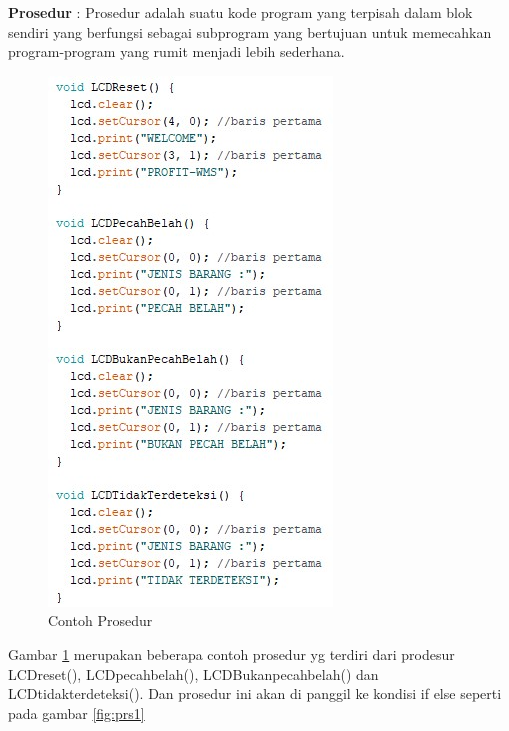 \textbf{Prosedur} :
Prosedur adalah suatu kode program yang terpisah dalam blok sendiri yang berfungsi sebagai subprogram yang bertujuan untuk memecahkan program-program yang rumit menjadi lebih sederhana. 
\begin{figure}[!htbp]
\centering
\includegraphics[width=.75\textwidth]{figures/CONV/prs.jpg}
\caption{Contoh Prosedur}\label{fig:prs}
\end{figure}

Gambar \ref{fig:prs} merupakan  beberapa contoh prosedur yg terdiri dari prodesur  LCDreset(), LCDpecahbelah(), LCDBukanpecahbelah() dan LCDtidakterdeteksi(). Dan prosedur ini akan di panggil ke kondisi if else seperti pada gambar \ref{fig:prs1}

